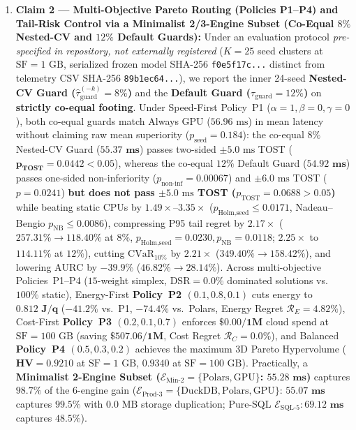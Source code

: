 \documentclass[10pt,a4paper]{article}
\begin{document}
\begin{enumerate}[leftmargin=1.5em,itemsep=3pt]
    \item \textbf{Claim 2 --- Multi-Objective Pareto Routing (Policies P1--P4) and Tail-Risk Control via a Minimalist 2/3-Engine Subset (Co-Equal $8\%$ Nested-CV and $12\%$ Default Guards):} Under an evaluation protocol \emph{pre-specified in repository, not externally registered} ($K=25$ seed clusters at $\text{SF}=1\text{ GB}$, serialized frozen model SHA-256 \texttt{f0e5f17c...} distinct from telemetry CSV SHA-256 \texttt{89b1ec64...}), we report the inner 24-seed \textbf{Nested-CV Guard ($\hat{\tau}_{\text{guard}}^{(-k)}=8\%$)} and the \textbf{Default Guard ($\tau_{\text{guard}}=12\%$)} on \textbf{strictly co-equal footing}. Under Speed-First Policy~P1 ($\alpha=1,\beta=0,\gamma=0$), both co-equal guards match Always GPU ($56.96\text{ ms}$) in mean latency without claiming raw mean superiority ($p_{\text{seed}}=0.184$): the co-equal $8\%$ Nested-CV Guard ($\mathbf{55.37\text{ ms}}$) passes two-sided $\pm 5.0\text{ ms}$ TOST ($\mathbf{p_{\text{TOST}}=0.0442 < 0.05}$), whereas the co-equal $12\%$ Default Guard ($\mathbf{54.92\text{ ms}}$) passes one-sided non-inferiority ($p_{\text{non-inf}}=0.00067$) and $\pm 6.0\text{ ms}$ TOST ($p=0.0241$) \textbf{but does not pass $\pm 5.0\text{ ms}$ TOST ($p_{\text{TOST}}=0.0688 > 0.05$)} while beating static CPUs by $1.49\times\text{--}3.35\times$ ($p_{\text{Holm,seed}}\le 0.0171$, Nadeau--Bengio $p_{\text{NB}}\le 0.0086$), compressing P95 tail regret by $\mathbf{2.17\times}$ ($257.31\% \rightarrow \mathbf{118.40\%}$ at $8\%$, $p_{\text{Holm,seed}}=0.0230, p_{\text{NB}}=0.0118$; $\mathbf{2.25\times}$ to $\mathbf{114.11\%}$ at $12\%$), cutting $\text{CVaR}_{10\%}$ by $\mathbf{2.21\times}$ ($349.40\% \rightarrow \mathbf{158.42\%}$), and lowering $\text{AURC}$ by $\mathbf{-39.9\%}$ ($46.82\% \rightarrow 28.14\%$). Across multi-objective Policies~P1--P4 ($15$-weight simplex, $\text{DSR}=\mathbf{0.0\%}$ dominated solutions vs.\ $100\%$ static), Energy-First \textbf{Policy~P2 $(0.1,0.8,0.1)$} cuts energy to $\mathbf{0.812\text{ J/q}}$ ($\mathbf{-41.2\%}$ vs.\ P1, $\mathbf{-74.4\%}$ vs.\ Polars, Energy Regret $\mathcal{R}_E=4.82\%$), Cost-First \textbf{Policy~P3 $(0.2,0.1,0.7)$} enforces $\mathbf{\$0.00/1\text{M}}$ cloud spend at $\text{SF}=100\text{ GB}$ (saving $\mathbf{\$507.06/1\text{M}}$, Cost Regret $\mathcal{R}_C=0.0\%$), and Balanced \textbf{Policy~P4 $(0.5,0.3,0.2)$} achieves the maximum 3D Pareto Hypervolume ($\mathbf{\text{HV}=0.9210}$ at $\text{SF}=1\text{ GB}$, $\mathbf{0.9340}$ at $\text{SF}=100\text{ GB}$). Practically, a \textbf{Minimalist 2-Engine Subset ($\mathcal{E}_{\text{Min-2}}=\{\text{Polars},\text{GPU}\}$: $\mathbf{55.28\text{ ms}}$)} captures $\mathbf{98.7\%}$ of the 6-engine gain ($\mathcal{E}_{\text{Prod-3}}=\{\text{DuckDB},\text{Polars},\text{GPU}\}$: $\mathbf{55.07\text{ ms}}$ captures $\mathbf{99.5\%}$ with $0.0\text{ MB}$ storage duplication; Pure-SQL $\mathcal{E}_{\text{SQL-5}}: \mathbf{69.12\text{ ms}}$ captures $48.5\%$).

\end{enumerate}
\end{document}

